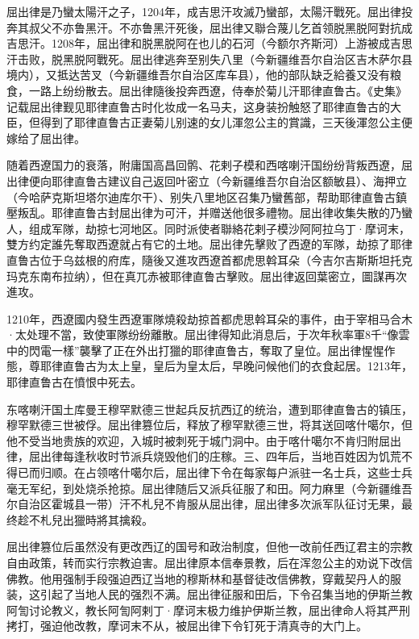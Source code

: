 屈出律是乃蠻太陽汗之子，1204年，成吉思汗攻滅乃蠻部，太陽汗戰死。屈出律投奔其叔父不亦鲁黑汗。不亦鲁黑汗死後，屈出律又聯合蔑儿乞首领脱黑脱阿對抗成吉思汗。1208年，屈出律和脱黑脱阿在也儿的石河（今额尔齐斯河）上游被成吉思汗击败，脱黑脱阿戰死。屈出律逃奔至别失八里（今新疆维吾尔自治区吉木萨尔县境内），又抵达苦叉（今新疆维吾尔自治区库车县），他的部队缺乏給養又没有粮食，一路上纷纷散去。屈出律隨後投奔西遼，侍奉於菊儿汗耶律直鲁古。《史集》记载屈出律觐见耶律直鲁古时化妆成一名马夫，这身装扮触怒了耶律直鲁古的大臣，但得到了耶律直鲁古正妻菊儿别速的女儿渾忽公主的賞識，三天後渾忽公主便嫁给了屈出律。

随着西遼国力的衰落，附庸国高昌回鹘、花剌子模和西喀喇汗国纷纷背叛西遼，屈出律便向耶律直鲁古建议自己返回叶密立（今新疆维吾尔自治区额敏县）、海押立（今哈萨克斯坦塔尔迪库尔干）、别失八里地区召集乃蠻舊部，帮助耶律直鲁古鎮壓叛乱。耶律直鲁古封屈出律为可汗，并赠送他很多禮物。屈出律收集失散的乃蠻人，组成军隊，劫掠七河地区。同时派使者聯絡花剌子模沙阿阿拉乌丁·摩诃末，雙方约定誰先奪取西遼就占有它的土地。屈出律先擊败了西遼的军隊，劫掠了耶律直鲁古位于乌兹根的府库，隨後又進攻西遼首都虎思斡耳朵（今吉尔吉斯斯坦托克玛克东南布拉纳），但在真兀赤被耶律直鲁古擊败。屈出律返回葉密立，圖謀再次進攻。

1210年，西遼國内發生西遼軍隊燒殺劫掠首都虎思斡耳朵的事件，由于宰相马合木·太处理不當，致使軍隊纷纷離散。屈出律得知此消息后，于次年秋率軍8千“像雲中的閃電一樣”襲擊了正在外出打獵的耶律直鲁古，奪取了皇位。屈出律惺惺作態，尊耶律直鲁古为太上皇，皇后为皇太后，早晚问候他们的衣食起居。1213年，耶律直鲁古在憤恨中死去。

东喀喇汗国土库曼王穆罕默德三世起兵反抗西辽的统治，遭到耶律直鲁古的镇压，穆罕默德三世被俘。屈出律篡位后，释放了穆罕默德三世，将其送回喀什噶尔，但他不受当地贵族的欢迎，入城时被刺死于城门洞中。由于喀什噶尔不肯归附屈出律，屈出律每逢秋收时节派兵烧毁他们的庄稼。三、四年后，当地百姓因为饥荒不得已而归顺。在占领喀什噶尔后，屈出律下令在每家每户派驻一名士兵，这些士兵毫无军纪，到处烧杀抢掠。屈出律随后又派兵征服了和田。阿力麻里（今新疆维吾尔自治区霍城县一带）汗不札兒不肯服从屈出律，屈出律多次派军队征讨无果，最终趁不札兒出獵時將其擒殺。

屈出律篡位后虽然没有更改西辽的国号和政治制度，但他一改前任西辽君主的宗教自由政策，转而实行宗教迫害。屈出律原本信奉景教，后在浑忽公主的劝说下改信佛教。他用强制手段强迫西辽当地的穆斯林和基督徒改信佛教，穿戴契丹人的服装，这引起了当地人民的强烈不满。屈出律征服和田后，下令召集当地的伊斯兰教阿訇讨论教义，教长阿訇阿剌丁·摩诃末极力维护伊斯兰教，屈出律命人将其严刑拷打，强迫他改教，摩诃末不从，被屈出律下令钉死于清真寺的大门上。

